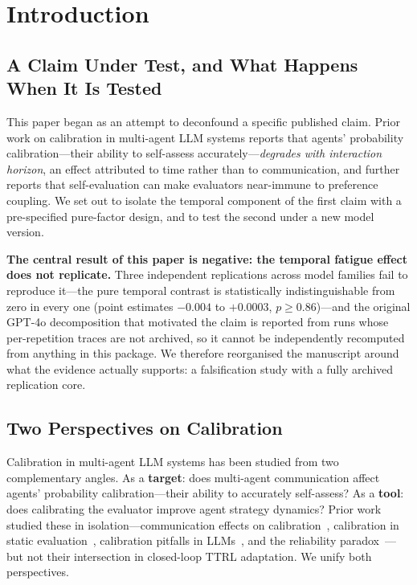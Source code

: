 \documentclass[11pt]{article}
\theoremstyle{definition}
\theoremstyle{remark}
\begin{document}
\newpage

\section{Introduction}

\subsection{A Claim Under Test, and What Happens When It Is Tested}

This paper began as an attempt to deconfound a specific published claim. Prior work on calibration in multi-agent LLM systems reports that agents' probability calibration---their ability to self-assess accurately---\emph{degrades with interaction horizon}, an effect attributed to time rather than to communication, and further reports that self-evaluation can make evaluators near-immune to preference coupling. We set out to isolate the temporal component of the first claim with a pre-specified pure-factor design, and to test the second under a new model version.

\textbf{The central result of this paper is negative: the temporal fatigue effect does not replicate.} Three independent replications across model families fail to reproduce it---the pure temporal contrast is statistically indistinguishable from zero in every one (point estimates $-0.004$ to $+0.0003$, $p \geq 0.86$)---and the original GPT-4o decomposition that motivated the claim is reported from runs whose per-repetition traces are not archived, so it cannot be independently recomputed from anything in this package. We therefore reorganised the manuscript around what the evidence actually supports: a falsification study with a fully archived replication core.

\subsection{Two Perspectives on Calibration}

Calibration in multi-agent LLM systems has been studied from two complementary angles. As a \textbf{target}: does multi-agent communication affect agents' probability calibration---their ability to accurately self-assess? As a \textbf{tool}: does calibrating the evaluator improve agent strategy dynamics? Prior work studied these in isolation---communication effects on calibration~\citep{huang2026cagecal}, calibration in static evaluation~\citep{guo2017calibration}, calibration pitfalls in LLMs~\citep{tian2023just}, and the reliability paradox~\citep{messing2026tee}---but not their intersection in closed-loop TTRL adaptation. We unify both perspectives.
\end{document}
